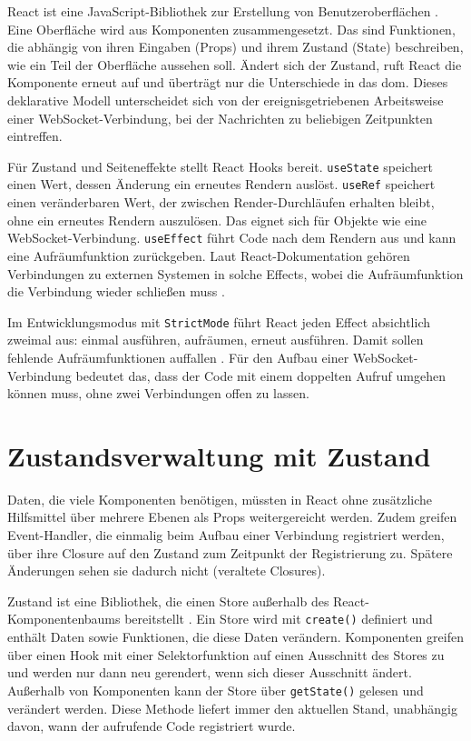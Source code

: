 React ist eine JavaScript-Bibliothek zur Erstellung von Benutzeroberflächen . Eine Oberfläche wird aus Komponenten zusammengesetzt. Das sind Funktionen, die abhängig von ihren Eingaben (Props) und ihrem Zustand (State) beschreiben, wie ein Teil der Oberfläche aussehen soll. Ändert sich der Zustand, ruft React die Komponente erneut auf und überträgt nur die Unterschiede in das \gls{dom}. Dieses deklarative Modell unterscheidet sich von der ereignisgetriebenen Arbeitsweise einer WebSocket-Verbindung, bei der Nachrichten zu beliebigen Zeitpunkten eintreffen.

Für Zustand und Seiteneffekte stellt React Hooks bereit. \texttt{useState} speichert einen Wert, dessen Änderung ein erneutes Rendern auslöst. \texttt{useRef} speichert einen veränderbaren Wert, der zwischen Render-Durchläufen erhalten bleibt, ohne ein erneutes Rendern auszulösen. Das eignet sich für Objekte wie eine WebSocket-Verbindung. \texttt{useEffect} führt Code nach dem Rendern aus und kann eine Aufräumfunktion zurückgeben. Laut React-Dokumentation gehören Verbindungen zu externen Systemen in solche Effects, wobei die Aufräumfunktion die Verbindung wieder schließen muss .

Im Entwicklungsmodus mit \texttt{StrictMode} führt React jeden Effect absichtlich zweimal aus: einmal ausführen, aufräumen, erneut ausführen. Damit sollen fehlende Aufräumfunktionen auffallen . Für den Aufbau einer WebSocket-Verbindung bedeutet das, dass der Code mit einem doppelten Aufruf umgehen können muss, ohne zwei Verbindungen offen zu lassen.

\section{Zustandsverwaltung mit Zustand}
\label{sec:zustand}

Daten, die viele Komponenten benötigen, müssten in React ohne zusätzliche Hilfsmittel über mehrere Ebenen als Props weitergereicht werden. Zudem greifen Event-Handler, die einmalig beim Aufbau einer Verbindung registriert werden, über ihre Closure auf den Zustand zum Zeitpunkt der Registrierung zu. Spätere Änderungen sehen sie dadurch nicht (veraltete Closures).

Zustand ist eine Bibliothek, die einen Store außerhalb des React-Komponentenbaums bereitstellt . Ein Store wird mit \texttt{create()} definiert und enthält Daten sowie Funktionen, die diese Daten verändern. Komponenten greifen über einen Hook mit einer Selektorfunktion auf einen Ausschnitt des Stores zu und werden nur dann neu gerendert, wenn sich dieser Ausschnitt ändert. Außerhalb von Komponenten kann der Store über \texttt{getState()} gelesen und verändert werden. Diese Methode liefert immer den aktuellen Stand, unabhängig davon, wann der aufrufende Code registriert wurde.


